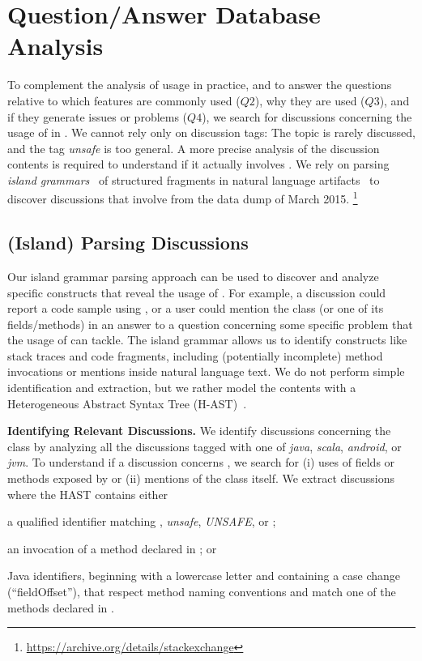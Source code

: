 \section{Question/Answer Database Analysis}\label{sec:unsafe:so}

To complement the analysis of \smu{} usage in practice,
and to answer the questions relative to which features are commonly used ($Q2$),
why they are used ($Q3$),
and if they generate issues or problems ($Q4$),
we search for discussions concerning the usage of \smu{} in \stackoverflow{}.
We cannot rely only on \stackoverflow{} discussion tags:
The topic is rarely discussed,
and the tag \emph{unsafe} is too general.
A more precise analysis of the discussion contents is required to understand if it actually involves \smu{}.
We rely on parsing \emph{island grammars}~\cite{Moon2001a} of structured fragments in natural language artifacts~\cite{Bacc2011f,Ponz2015a} to discover discussions that involve \smu{} from the \stackoverflow{} data dump of March 2015.%
\footnote{\url{https://archive.org/details/stackexchange}}

\subsection{(Island) Parsing \stackoverflow{} Discussions}

Our island grammar parsing approach can be used to discover and analyze specific constructs that reveal the usage of \smu{}.
For example, a discussion could report a code sample using \smu{},
or a user could mention the class (or one of its fields/methods) in an answer to a question concerning some specific problem that the usage of \smu{} can tackle.
The island grammar allows us to identify constructs like stack traces and \java{} code fragments,
including (potentially incomplete) method invocations or mentions inside natural language text.
We do not perform simple identification and extraction,
but we rather model the contents with a Heterogeneous Abstract Syntax Tree (H-AST)~\cite{Ponz2015a}.

\textbf{Identifying Relevant Discussions.}
We identify \stackoverflow discussions concerning the \smu{} class by analyzing all the discussions tagged with one of \emph{java}, \emph{scala}, \emph{android}, or \emph{jvm}. To understand if a discussion concerns \smu{}, we search for (i) uses of fields or methods exposed by \unsafe{} or (ii) mentions of the class itself. We extract discussions where the HAST contains either \begin{inparaenum}[(i)] \item a qualified identifier matching  \unsafe{}, \emph{unsafe}, \emph{UNSAFE}, or \smu{}; \item  an invocation of a method declared in \smu; or \item Java identifiers, beginning with a lowercase letter and containing a case change (\eg ``fieldOffset''), that respect method naming conventions and match one of the methods declared in \unsafe{}. \end{inparaenum}


